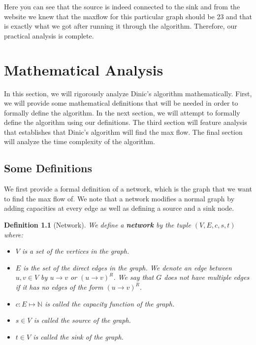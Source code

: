 \documentclass{report}
\newtheorem{definition}{Definition}[section]
\begin{document}
Here you can see that the source is indeed connected to the sink and from the website we knew that the maxflow for this particular graph should be 23 and that is exactly what we got after running it through the algorithm. Therefore, our practical analysis is complete.

\chapter{Mathematical Analysis}
In this section, we will rigorously analyze Dinic's algorithm mathematically. First, we will provide some mathematical definitions that will be needed in order to formally define the algorithm. In the next section, we will attempt to formally define the algorithm using our definitions. The third section will feature analysis that establishes that Dinic's algorithm will find the max flow. The final section will analyze the time complexity of the algorithm.
\section{Some Definitions}
We first provide a formal definition of a network, which is the graph that we want to find the max flow of. We note that a network modifies a normal graph by adding capacities at every edge as well as defining a source and a sink node.
\begin{definition}[Network]
    We define a \textbf{network} by the tuple $(V, E, c, s, t)$ where:
    \begin{itemize}
        \item $V$ is a set of the vertices in the graph.
        \item $E$ is the set of the direct edges in the graph. We denote an edge between $u, v \in V$ by $u \rightarrow v$ or $(u \rightarrow v)^R$. We say that $G$ does not have multiple edges if it has no edges of the form $(u \rightarrow v)^R$.
        \item $c : E \mapsto \mathbb{N}$ is called the capacity function of the graph.
        \item $s \in V$ is called the source of the graph.
        \item $t \in V$ is called the sink of the graph.
    \end{itemize}
\end{definition}
\end{document}
